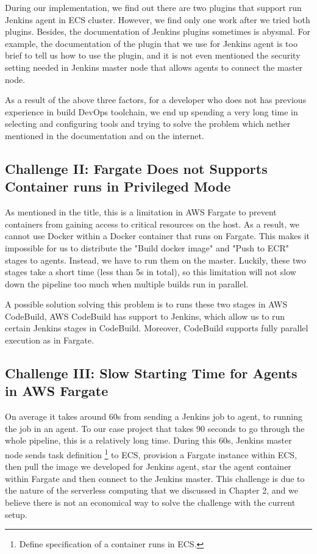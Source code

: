During our implementation, we find out there are two plugins that support run Jenkins agent in ECS cluster. However, we find only one work after we tried both plugins. Besides, the documentation of Jenkins plugins sometimes is abysmal. For example, the documentation of the plugin that we use for Jenkins agent is too brief to tell us how to use the plugin, and it is not even mentioned the security setting needed in Jenkins master node that allows agents to connect the master node. 
\par
As a result of the above three factors, for a developer who does not has previous experience in build DevOps toolchain, we end up spending a very long time in selecting and configuring tools and trying to solve the problem which nether mentioned in the documentation and on the internet. 
\subsection{Challenge II: Fargate Does not Supports Container runs in Privileged Mode}
As mentioned in the title, this is a limitation in AWS Fargate to prevent containers from gaining access to critical resources on the host. As a result, we cannot use Docker within a Docker container that runs on Fargate. This makes it impossible for us to distribute the "Build docker image" and "Push to ECR" stages to agents. Instead, we have to run them on the master. Luckily, these two stages take a short time (less than 5s in total), so this limitation will not slow down the pipeline too much when multiple builds run in parallel.
\par
A possible solution solving this problem is to runs these two stages in AWS CodeBuild, AWS CodeBuild has support to Jenkins, which allow us to run certain Jenkins stages in CodeBuild. Moreover, CodeBuild supports fully parallel execution as in Fargate.
\subsection{Challenge III: Slow Starting Time for Agents in AWS Fargate}
On average it takes around 60s from sending a Jenkins job to agent, to running the job in an agent. To our case project that takes 90 seconds to go through the whole pipeline, this is a relatively long time. During this 60s, Jenkins master node sends task definition \footnote{Define specification of a container runs in ECS.} to ECS, provision a Fargate instance within ECS, then pull the image we developed for Jenkins agent, star the agent container within Fargate and then connect to the Jenkins master. This challenge is due to the nature of the serverless computing that we discussed in Chapter 2, and we believe there is not an economical way to solve the challenge with the current setup.
